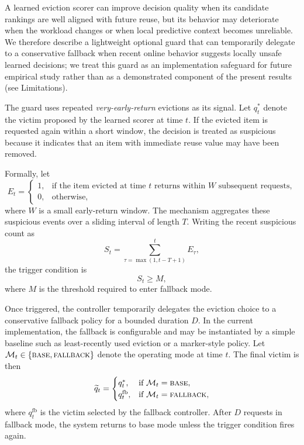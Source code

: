 \documentclass[preprint,12pt]{elsarticle}
\begin{document}
A learned eviction scorer can improve decision quality when its candidate rankings are well aligned with future reuse, but its behavior may deteriorate when the workload changes or when local predictive context becomes unreliable. We therefore describe a lightweight optional guard that can temporarily delegate to a conservative fallback when recent online behavior suggests locally unsafe learned decisions; we treat this guard as an implementation safeguard for future empirical study rather than as a demonstrated component of the present results (see Limitations).

The guard uses repeated \emph{very-early-return} evictions as its signal. Let $q_t^{*}$ denote the victim proposed by the learned scorer at time $t$. If the evicted item is requested again within a short window, the decision is treated as suspicious because it indicates that an item with immediate reuse value may have been removed.

Formally, let
\begin{equation}
E_t =
\begin{cases}
1, & \text{if the item evicted at time } t \text{ returns within } W \text{ subsequent requests},\\
0, & \text{otherwise},
\end{cases}
\label{eq:early_return_signal}
\end{equation}
where $W$ is a small early-return window. The mechanism aggregates these suspicious events over a sliding interval of length $T$. Writing the recent suspicious count as
\begin{equation}
S_t = \sum_{\tau=\max(1,t-T+1)}^{t} E_{\tau},
\label{eq:suspicious_count}
\end{equation}
the trigger condition is
\begin{equation}
S_t \geq M,
\label{eq:guard_trigger}
\end{equation}
where $M$ is the threshold required to enter fallback mode.

Once triggered, the controller temporarily delegates the eviction choice to a conservative fallback policy for a bounded duration $D$. In the current implementation, the fallback is configurable and may be instantiated by a simple baseline such as least-recently used eviction or a marker-style policy. Let $\mathcal{M}_t \in \{\textsc{base}, \textsc{fallback}\}$ denote the operating mode at time $t$. The final victim is then
\begin{equation}
\widetilde{q}_t =
\begin{cases}
q_t^{*}, & \text{if } \mathcal{M}_t = \textsc{base},\\
q_t^{\mathrm{fb}}, & \text{if } \mathcal{M}_t = \textsc{fallback},
\end{cases}
\label{eq:final_victim}
\end{equation}
where $q_t^{\mathrm{fb}}$ is the victim selected by the fallback controller. After $D$ requests in fallback mode, the system returns to base mode unless the trigger condition fires again.
\end{document}

